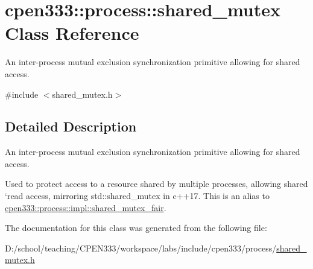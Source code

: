 \hypertarget{classcpen333_1_1process_1_1shared__mutex}{}\section{cpen333\+:\+:process\+:\+:shared\+\_\+mutex Class Reference}
\label{classcpen333_1_1process_1_1shared__mutex}


An inter-\/process mutual exclusion synchronization primitive allowing for shared access.  




{\ttfamily \#include $<$shared\+\_\+mutex.\+h$>$}



\subsection{Detailed Description}
An inter-\/process mutual exclusion synchronization primitive allowing for shared access. 

Used to protect access to a resource shared by multiple processes, allowing shared `read\textquotesingle{} access, mirroring std\+::shared\+\_\+mutex in c++17. This is an alias to \hyperlink{classcpen333_1_1process_1_1impl_1_1shared__mutex__fair}{cpen333\+::process\+::impl\+::shared\+\_\+mutex\+\_\+fair}. 

The documentation for this class was generated from the following file\+:\begin{DoxyCompactItemize}
\item 
D\+:/school/teaching/\+C\+P\+E\+N333/workspace/labs/include/cpen333/process/\hyperlink{process_2shared__mutex_8h}{shared\+\_\+mutex.\+h}\end{DoxyCompactItemize}
